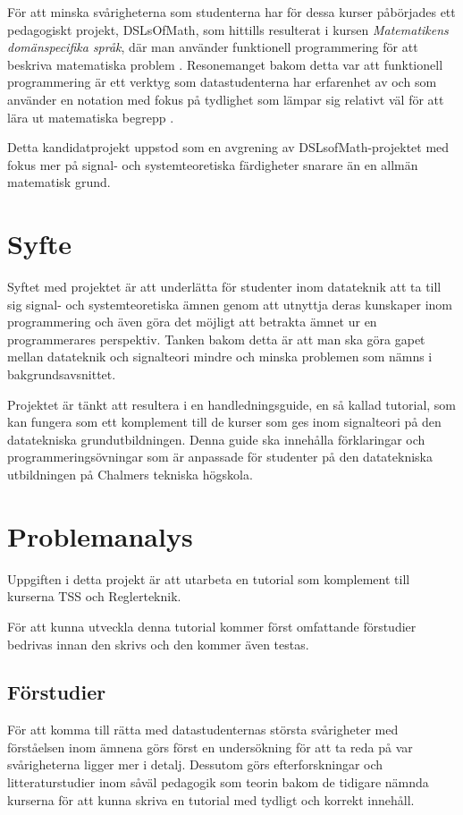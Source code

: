 \documentclass{article}
\begin{document}
För att minska svårigheterna som studenterna har för dessa kurser
påbörjades ett pedagogiskt projekt, DSLsOfMath, som hittills
resulterat i kursen \textit{Matematikens domänspecifika språk}, där man
använder funktionell programmering för att beskriva matematiska problem \cite{kursplan:dslsofmath}.
Resonemanget bakom detta var att funktionell programmering är ett
verktyg som datastudenterna har erfarenhet av och som använder en
notation med fokus på tydlighet som lämpar sig relativt väl för
att lära ut matematiska begrepp \cite{tfpie}.

Detta kandidatprojekt uppstod som en avgrening av DSLsofMath-projektet
med fokus mer på signal- och systemteoretiska färdigheter snarare än
en allmän matematisk grund.

\section{Syfte}
Syftet med projektet är att underlätta för studenter inom datateknik
att ta till sig signal- och systemteoretiska ämnen genom att utnyttja
deras kunskaper inom programmering och även göra det möjligt att
betrakta ämnet ur en programmerares perspektiv.
Tanken bakom detta är att man ska göra gapet mellan
datateknik och signalteori mindre och minska problemen
som nämns i bakgrundsavsnittet.

Projektet är tänkt att resultera i en handledningsguide, en så kallad
tutorial, som kan fungera som ett komplement till de kurser som ges
inom signalteori på den datatekniska grundutbildningen.
Denna guide ska innehålla förklaringar och programmeringsövningar
som är anpassade för studenter på den datatekniska utbildningen på Chalmers tekniska högskola.

\section{Problemanalys}
Uppgiften i detta projekt är att utarbeta en tutorial som
komplement till kurserna TSS och Reglerteknik.

För att kunna utveckla denna tutorial kommer först omfattande
förstudier bedrivas innan den skrivs och den kommer även testas.

\subsection{Förstudier}
För att komma till rätta med datastudenternas största svårigheter med
förståelsen inom ämnena görs först en undersökning för att ta reda på
var svårigheterna ligger mer i detalj.
%
Dessutom görs efterforskningar och litteraturstudier inom såväl
pedagogik som teorin bakom de tidigare nämnda kurserna för att kunna
skriva en tutorial med tydligt och korrekt innehåll.
\end{document}
